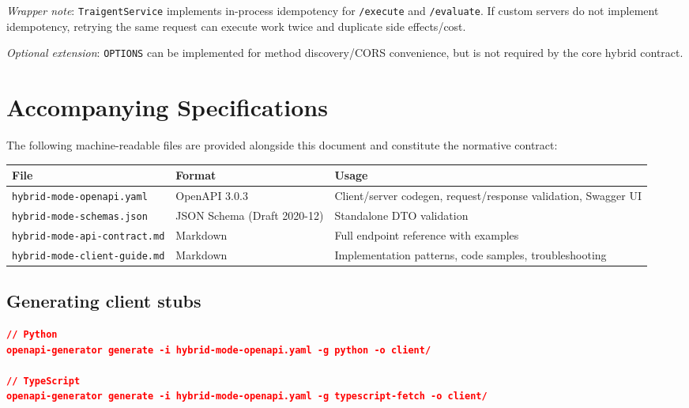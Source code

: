 \documentclass[11pt,a4paper]{article}
\begin{document}
\textit{Wrapper note}: \texttt{TraigentService} implements in-process idempotency
for \texttt{/execute} and \texttt{/evaluate}. If custom servers do not implement
idempotency, retrying the same request can execute work twice and duplicate
side effects/cost.

\textit{Optional extension}: \texttt{OPTIONS} can be implemented for method
discovery/CORS convenience, but is not required by the core hybrid contract.

\section{Accompanying Specifications}

The following machine-readable files are provided alongside this document and
constitute the normative contract:

\begin{center}\small
\begin{tabularx}{\textwidth}{@{}llX@{}}
\toprule
\textbf{File} & \textbf{Format} & \textbf{Usage} \\
\midrule
\texttt{hybrid-mode-openapi.yaml}   & OpenAPI 3.0.3 & Client/server codegen, request/response validation, Swagger UI \\
\texttt{hybrid-mode-schemas.json}   & JSON Schema (Draft 2020-12) & Standalone DTO validation \\
\texttt{hybrid-mode-api-contract.md}& Markdown & Full endpoint reference with examples \\
\texttt{hybrid-mode-client-guide.md}& Markdown & Implementation patterns, code samples, troubleshooting \\
\bottomrule
\end{tabularx}
\end{center}

\subsection{Generating client stubs}

\begin{lstlisting}[language=json,basicstyle=\ttfamily\footnotesize]
// Python
openapi-generator generate -i hybrid-mode-openapi.yaml -g python -o client/

// TypeScript
openapi-generator generate -i hybrid-mode-openapi.yaml -g typescript-fetch -o client/
\end{lstlisting}
\end{document}
